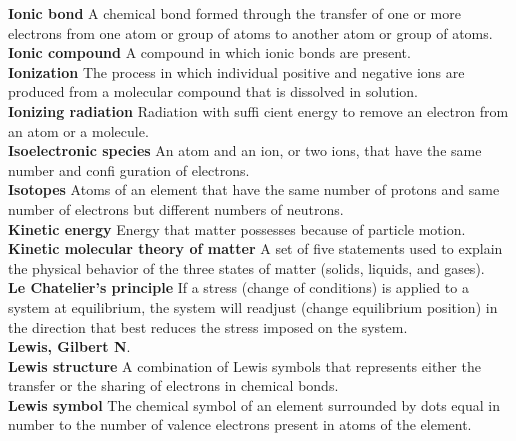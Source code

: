 \documentclass[10pt, roman]{article}
\begin{document}
\begin{minipage}[c]{0.30\textwidth}
\textbf{Ionic bond} A chemical bond formed through the transfer of one or more electrons from one atom or group of atoms to another atom or group of atoms. \\
\textbf{Ionic compound} A compound in which ionic bonds are present. \\
\textbf{Ionization} The process in which individual positive and negative ions are produced from a molecular compound that is dissolved in solution. \\
\textbf{Ionizing radiation} Radiation with suffi cient energy to remove an electron from an atom or a molecule. \\
\textbf{Isoelectronic species} An atom and an ion, or two ions, that have the same number and confi guration of electrons. \\
\textbf{Isotopes} Atoms of an element that have the same number of protons and same number of electrons but different numbers of neutrons. \\
\textbf{Kinetic energy} Energy that matter possesses because of particle motion. \\
\textbf{Kinetic molecular theory of matter} A set of five statements used to explain the physical behavior of the three states of matter (solids, liquids, and gases). \\
\textbf{Le Chatelier’s principle} If a stress (change of conditions) is applied to a system at equilibrium, the system will readjust (change equilibrium position) in the direction that best reduces the stress imposed on the system. \\
\textbf{Lewis, Gilbert N}. \\
\textbf{Lewis structure} A combination of Lewis symbols that represents either the transfer or the sharing of electrons in chemical bonds. \\
\textbf{Lewis symbol} The chemical symbol of an element surrounded by dots equal in number to the number of valence electrons present in atoms of the element. \\
\end{minipage}%
\hfill
\end{document}
